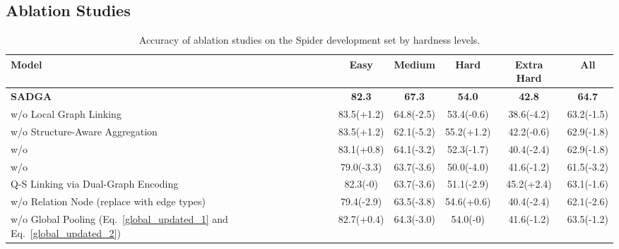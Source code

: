 \documentclass{article}
\begin{document}
\subsection{Ablation Studies}

\begin{table*}[hbt]
    \setlength\tabcolsep{2pt}
    \caption{Accuracy of ablation studies on the Spider development set by hardness levels.}
    \label{ablation_studies_result} 
    \renewcommand\arraystretch{1.1}
    \centering
    \footnotesize
    \begin{tabular}{lccccc}
        \toprule
        \textbf{Model}                                                                      & \textbf{Easy}         & \textbf{Medium}       & \textbf{Hard}        & \textbf{Extra Hard}   & \textbf{All}\\ 
        \hline\hline
        \textbf{SADGA}                                                                      & \textbf{82.3}         & \textbf{67.3}         & \textbf{54.0}        & \textbf{42.8}          &\textbf{64.7}\\
        \quad w/o Local Graph Linking                                                       & 83.5(+1.2)            & 64.8(-2.5)            & 53.4(-0.6)           & 38.6(-4.2)             & 63.2(-1.5)\\
        \quad w/o Structure-Aware Aggregation                                               & 83.5(+1.2)            & 62.1(-5.2)            & 55.2(+1.2)           & 42.2(-0.6)             & 62.9(-1.8)\\
        \quad w/o                        & 83.1(+0.8)            & 64.1(-3.2)            & 52.3(-1.7)           & 40.4(-2.4)             & 62.9(-1.8)\\
        \quad w/o                        & 79.0(-3.3)            & 63.7(-3.6)            & 50.0(-4.0)           & 41.6(-1.2)             & 61.5(-3.2)\\
        \quad Q-S Linking via Dual-Graph Encoding                                           & 82.3(-0)              & 63.7(-3.6)            & 51.1(-2.9)           & 45.2(+2.4)             & 63.1(-1.6)\\
        \quad w/o Relation Node (replace with edge types)                                   & 79.4(-2.9)            & 63.5(-3.8)            & 54.6(+0.6)           & 40.4(-2.4)             & 62.1(-2.6)\\
        \quad w/o Global Pooling (Eq.~\ref{global_updated_1} and Eq.~\ref{global_updated_2})& 82.7(+0.4)            & 64.3(-3.0)            & 54.0(-0)             & 41.6(-1.2)             & 63.5(-1.2)\\

\end{tabular}
\end{table*}
\end{document}
